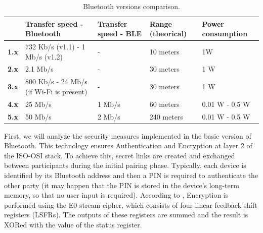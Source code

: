 \documentclass[english]{article}
\newcounter{subsubsubsection}[subsubsection]
\begin{document}
\begin{table}[h]
  \caption{Bluetooth versions comparison.}
  \centering
  \begin{adjustbox}{max width=\textwidth}
  \begin{tabular}{l|l|l|l|l|}
  \cline{2-5}
                                     & \textbf{Transfer speed - Bluetooth}      & \textbf{Transfer speed - BLE} & \textbf{Range (theorical)} & \textbf{Power consumption} \\ \hline
  \multicolumn{1}{|l|}{\textbf{1.x}} & 732 Kb/s (v1.1) - 1 Mb/s (v1.2)            & -                             & 10 meters                  & 1W                         \\ \hline
  \multicolumn{1}{|l|}{\textbf{2.x}} & 2.1 Mb/s                                 & -                             & 30 meters                  & 1 W                        \\ \hline
  \multicolumn{1}{|l|}{\textbf{3.x}} & 800 Kb/s - 24 Mb/s (if Wi-Fi is present) & -                             & 30 meters                  & 1 W                        \\ \hline
  \multicolumn{1}{|l|}{\textbf{4.x}} & 25 Mb/s                                  & 1 Mb/s                        & 60 meters                  & 0.01 W - 0.5 W             \\ \hline
  \multicolumn{1}{|l|}{\textbf{5.x}} & 50 Mb/s                                  & 2 Mb/s                        & 240 meters                 & 0.01 W - 0.5 W             \\ \hline
  \end{tabular}
  \end{adjustbox}
  \label{tabBle}
\end{table}

First, we will analyze the security measures implemented in the basic version of Bluetooth. This technology ensures Authentication and Encryption at layer 2 of the ISO-OSI stack. To achieve this, secret links are created and exchanged between participants during the initial pairing phase. Typically, each device is identified by its Bluetooth address and then a PIN is required to authenticate the other party (it may happen that the PIN is stored in the device's long-term memory, so that no user input is required). According to \cite{1200664}, Encryption is performed using the E0 stream cipher, which consists of four linear feedback shift registers (LSFRs). The outputs of these registers are summed and the result is XORed with the value of the status register.
\end{document}
